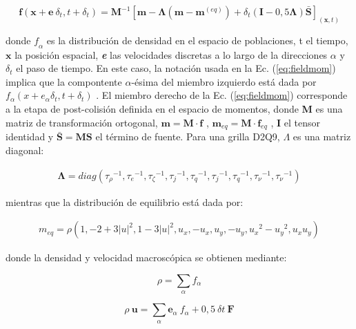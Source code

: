 \begin{equation}
    \mathbf{f}(\mathbf{x} + \mathbf{e} \> \delta_{t} , t + \delta_{t}) = \mathbf{M}^{-1} \left[ \mathbf{m} - \mathbf{\Lambda}(\mathbf{m} - \mathbf{m}^{(eq)}) + \delta_{t} \left( \mathbf{I} - 0,5 \mathbf{\Lambda} \right) \mathbf{\bar{S}}  \right]_{(\mathbf{x},t)} 
    \label{eq:fieldmom}
\end{equation}

donde $\textit{f}_{\alpha}$ es la distribución de densidad en el espacio de poblaciones, t el tiempo, $\mathbf{x}$ la posición espacial, \textit{\textbf{e}} las velocidades discretas a lo largo de la direcciones $\alpha$ y $\delta_{t}$ el paso de tiempo. En este caso, la notación usada en la Ec. (\ref{eq:fieldmom}) implica que la compontente $\alpha$-ésima del miembro izquierdo está dada por $f_{\alpha}(x + e_{\alpha} \delta_{t}  , t + \delta_{t} )$ . El miembro derecho de la Ec. (\ref{eq:fieldmom}) corresponde a la etapa de post-colisión definida en el espacio de momentos, donde \textbf{M} es una matriz de transformación ortogonal, $\mathbf{m} = \mathbf{M} \cdot \mathbf{f}$ , $\mathbf{m}_{eq} = \mathbf{M} \cdot \mathbf{f}_{eq}$ , \textbf{I} el tensor identidad y $\mathbf{\bar{S}} = \mathbf{M} \mathbf{S}$ el término de fuente. Para una grilla D2Q9, $ \Lambda$ es una matriz diagonal:
    
\begin{align}
    \mathbf{\Lambda}  = diag ( {\tau_{\rho }}^{-1},{\tau_{e}}^{-1},{\tau_{\zeta }}^{-1},{\tau_{j}}^{-1},{\tau_{q}}^{-1},{\tau_{j}}^{-1},{\tau_{q}}^{-1},{\tau_{\nu }}^{-1},{\tau_{\nu}}^{-1}) 
    \label{eq:lambda}
\end{align}

mientras que la distribución de equilibrio está dada por:
        

\begin{align}
    m_{eq} =  \rho  \left( 1, - 2 + 3 {|u|}^{2} , 1 - 3{|u|}^{2} , u_{x} , - u_{x} , u_{y} , - u_{y} , {u_{x}}^{2} - {u_{y}}^{2} , u_{x} u_{y} \right) 
    \label{eq:m}
\end{align}


donde la densidad y velocidad macroscópica se obtienen mediante:

\begin{equation}
        \rho = \sum_{\alpha} f_{\alpha}
\end{equation}

\begin{equation}
    \rho \> \mathbf{u} = \sum_{\alpha} {\mathbf{e}}_{\alpha} \> f_{\alpha} + 0,5 \> {\delta}{t} \> \mathbf{F}
\end{equation}

